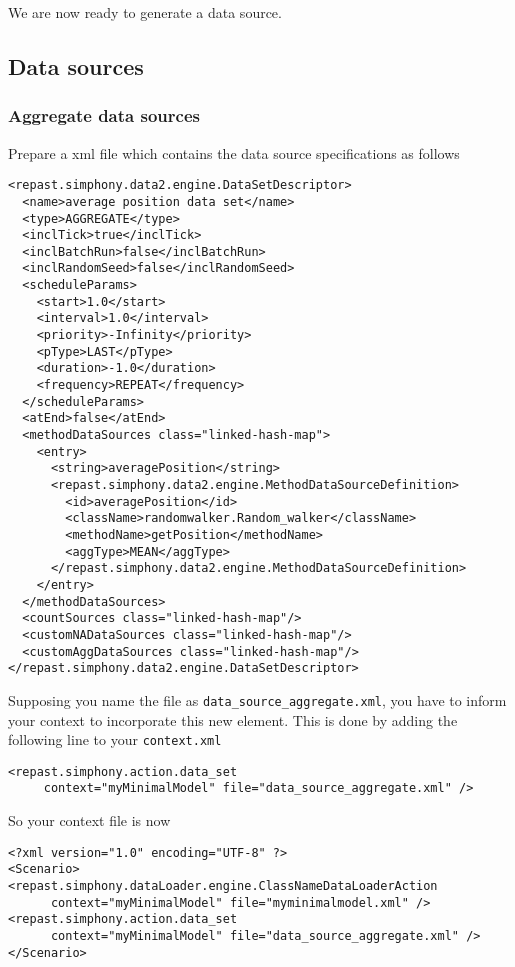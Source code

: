 \documentclass{article}
\begin{document}
We are now ready to generate a data source.


\subsection{Data sources}
\subsubsection{Aggregate data sources}
Prepare a xml file which contains the data source specifications as follows 

\begin{verbatim}
<repast.simphony.data2.engine.DataSetDescriptor>
  <name>average position data set</name>
  <type>AGGREGATE</type>
  <inclTick>true</inclTick>
  <inclBatchRun>false</inclBatchRun>
  <inclRandomSeed>false</inclRandomSeed>
  <scheduleParams>
    <start>1.0</start>
    <interval>1.0</interval>
    <priority>-Infinity</priority>
    <pType>LAST</pType>
    <duration>-1.0</duration>
    <frequency>REPEAT</frequency>
  </scheduleParams>
  <atEnd>false</atEnd>
  <methodDataSources class="linked-hash-map">
    <entry>
      <string>averagePosition</string>
      <repast.simphony.data2.engine.MethodDataSourceDefinition>
        <id>averagePosition</id>
        <className>randomwalker.Random_walker</className>
        <methodName>getPosition</methodName>
        <aggType>MEAN</aggType>
      </repast.simphony.data2.engine.MethodDataSourceDefinition>
    </entry>
  </methodDataSources>
  <countSources class="linked-hash-map"/>
  <customNADataSources class="linked-hash-map"/>
  <customAggDataSources class="linked-hash-map"/>
</repast.simphony.data2.engine.DataSetDescriptor>
\end{verbatim}

Supposing you name the file as \verb+data_source_aggregate.xml+, you have to inform your context to incorporate this new element. This is done by adding the following line to your \verb+context.xml+

\begin{verbatim}
<repast.simphony.action.data_set 
     context="myMinimalModel" file="data_source_aggregate.xml" />
\end{verbatim}

So your context file is now

\begin{verbatim}
<?xml version="1.0" encoding="UTF-8" ?>
<Scenario>
<repast.simphony.dataLoader.engine.ClassNameDataLoaderAction 
      context="myMinimalModel" file="myminimalmodel.xml" />
<repast.simphony.action.data_set 
      context="myMinimalModel" file="data_source_aggregate.xml" />
</Scenario>
\end{verbatim}
\end{document}
